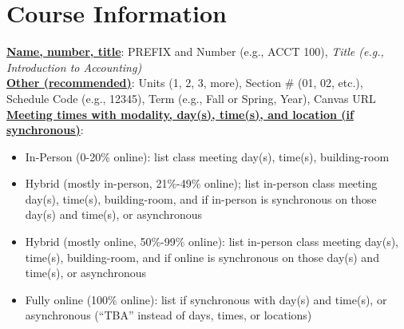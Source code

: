 \documentclass[12pt]{article} %
\begin{document}
\section*{Course Information}

\noindent \textbf{\underline{Name, number, title}}: PREFIX and Number (e.g., ACCT 100), \textit{Title (e.g., Introduction to Accounting)}
\vspace{0.5em} \\
\noindent \textbf{\underline{Other (recommended)}}: Units (1, 2, 3, more), Section \# (01, 02, etc.), Schedule Code (e.g., 12345), Term (e.g., Fall or Spring, Year), Canvas URL
\vspace{0.5em} \\
\noindent \textbf{\underline{Meeting times with modality, day(s), time(s), and location (if synchronous)}}:
\vspace{0.5em}


\begin{itemize}
\item In-Person (0-20\% online): list class meeting day(s), time(s), building-room
\item Hybrid (mostly in-person, 21\%-49\% online); list in-person class meeting day(s), time(s), building-room, and if in-person is synchronous on those day(s) and time(s), or asynchronous
\item Hybrid (mostly online, 50\%-99\% online): list in-person class meeting day(s), time(s), building-room, and if online is synchronous on those day(s) and time(s), or asynchronous
\item Fully online (100\% online): list if synchronous with day(s) and time(s), or asynchronous (``TBA'' instead of days, times, or locations)
\end{itemize}
\end{document}
